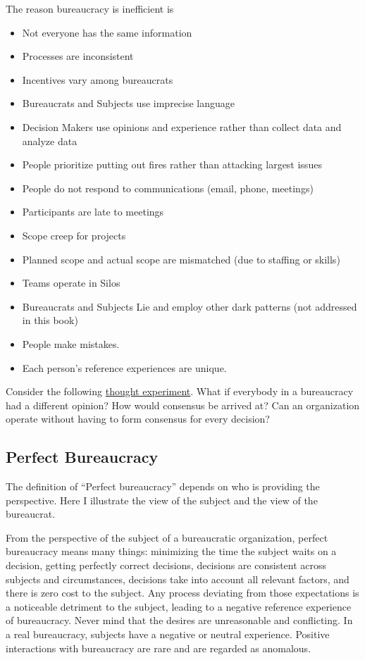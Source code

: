 The reason bureaucracy is inefficient is
\begin{itemize}
    \item Not everyone has the same information
    \item Processes are inconsistent
    \item Incentives vary among bureaucrats
    \item Bureaucrats and Subjects use imprecise language
    \item Decision Makers use opinions and experience rather than collect data and analyze data
    \item People prioritize putting out fires rather than attacking largest issues
    \item People do not respond to communications (email, phone, meetings)
    \item Participants are late to meetings
    \item Scope creep for projects
    \item Planned scope and actual scope are mismatched  (due to staffing or skills) 
    \item Teams operate in Silos
    \item Bureaucrats and Subjects Lie and employ other dark patterns (not addressed in this book)
    \item People make mistakes.
    \item Each person's reference experiences are unique.
\end{itemize}
Consider the following \href{https://en.wikipedia.org/wiki/Thought_experiment}{thought experiment}. 
What if everybody in a bureaucracy had a different opinion? How would consensus be arrived at? Can an organization operate without having to form consensus for every decision? 



\subsection{Perfect Bureaucracy}

The definition of ``Perfect bureaucracy'' depends on who is providing the perspective. Here I illustrate the view of the subject and the view of the bureaucrat. 

From the perspective of the subject of a bureaucratic organization, perfect bureaucracy means many things: minimizing the time the subject waits on a decision, getting perfectly correct decisions, decisions are consistent across subjects and circumstances, decisions take into account all relevant factors, and there is zero cost to the subject. Any process deviating from those expectations is a noticeable detriment to the subject, leading to a negative reference experience of bureaucracy. Never mind that the desires are unreasonable and conflicting. In a real bureaucracy, subjects have a negative or neutral experience. Positive interactions with bureaucracy are rare and are regarded as anomalous.

